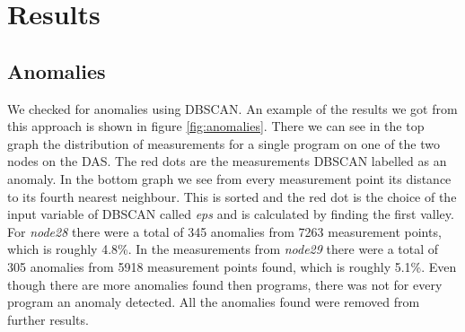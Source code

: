 \chapter{Results}
\label{ch:results}




\section{Anomalies}
We checked for anomalies using DBSCAN. An example of the results we got from this approach is shown in figure \ref{fig:anomalies}. There we can see in the top graph the distribution of measurements for a single program on one of the two nodes on the DAS. The red dots are the measurements DBSCAN labelled as an anomaly. In the bottom graph we see from every measurement point its distance to its fourth nearest neighbour. This is sorted and the red dot is the choice of the input variable of DBSCAN called \textit{eps} and is calculated by finding the first valley.\\

For \textit{node28} there were a total of 345 anomalies from 7263 measurement points, which is roughly 4.8\%. In the measurements from \textit{node29} there were a total of 305 anomalies from 5918 measurement points found, which is roughly 5.1\%. Even though there are more anomalies found then programs, there was not for every program an anomaly detected. All the anomalies found were removed from further results.


